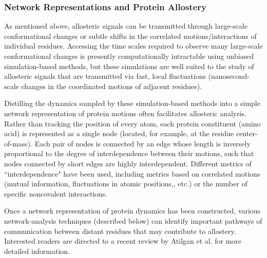 \subsubsection{Network Representations and Protein Allostery}
\par As mentioned above, allosteric signals can be transmitted through large-scale conformational changes or subtle shifts in the correlated motions/interactions of individual residues.\cite{Cooper1984a,Tsai2008a} Accessing the time scales required to observe many large-scale conformational changes is presently computationally intractable using unbiased simulation-based methods,\cite{Zwier2010,Noe2015} but these simulations are well suited to the study of allosteric signals that are transmitted via fast, local fluctuations (\ie nanosecond-scale changes in the coordinated motions of adjacent residues).
\par Distilling the dynamics sampled by these simulation-based methods into a simple  network representation of protein motions often facilitates allosteric analysis.\cite{Sethi2009,Gasper2012a,Freddolino2013,Yan2014,VanWart2012a,Ghosh2007,Collier2013} Rather than tracking the position of every atom, each protein constituent (\eg amino acid) is represented as a single node (located, for example, at the residue center-of-mass). Each pair of nodes is connected by an edge whose length is inversely proportional to the degree of interdependence between their motions, such that nodes connected by short edges are highly interdependent. Different metrics of ``interdependence" have been used, including metrics based on correlated motions (\eg mutual information,\cite{McClendon2009a,McClendon2012} fluctuations in atomic positions,\cite{Bradley2008c}, etc.) or the number of specific noncovalent interactions.\cite{Bradley2008c}
\par Once a network representation of protein dynamics has been constructed, various network-analysis techniques (described below) can identify important pathways of communication between distant residues that may contribute to allostery. Interested readers are directed to a recent review by Atilgan et al. for more detailed information.\cite{Atilgan2012}
